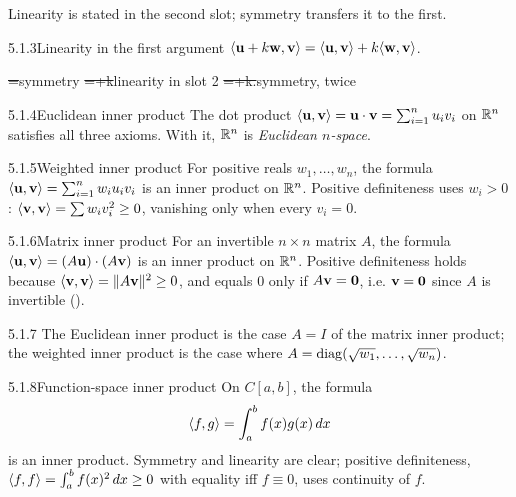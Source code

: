 Linearity is stated in the second slot; symmetry transfers it to the first.

\begin{lems}{5.1.3}{Linearity in the first argument}
$\langle \mathbf{u}+k\mathbf{w}, \mathbf{v} \rangle=\langle \mathbf{u}, \mathbf{v} \rangle+k\langle \mathbf{w}, \mathbf{v} \rangle$.
\end{lems}

\begin{prf}
\begin{steps}
\st{=}{symmetry}
\st{=\inner{\vv}{\vu}+k\inner{\vv}{\vw}}{linearity in slot 2}
\st{=\inner{\vu}{\vv}+k\inner{\vw}{\vv}.}{symmetry, twice}
\end{steps}
\end{prf}

\begin{exmp}{5.1.4}{Euclidean inner product}
The dot product $\langle \mathbf{u}, \mathbf{v} \rangle=\mathbf{u}\cdot\mathbf{v}=\sum_{i=1}^n u_iv_i$ on $\mathbb{R}^n$ satisfies all three axioms. With it, $\mathbb{R}^n$ is \emph{Euclidean $n$-space}.
\end{exmp}

\begin{exmp}{5.1.5}{Weighted inner product}
For positive reals $w_1,\dots,w_n$, the formula $\langle \mathbf{u}, \mathbf{v} \rangle=\sum_{i=1}^n w_iu_iv_i$ is an inner product on $\mathbb{R}^n$. Positive definiteness uses $w_i>0$: $\langle \mathbf{v}, \mathbf{v} \rangle=\sum w_iv_i^2\ge0$, vanishing only when every $v_i=0$.
\end{exmp}

\begin{exmp}{5.1.6}{Matrix inner product}
For an invertible $n\times n$ matrix $A$, the formula $\langle \mathbf{u}, \mathbf{v} \rangle=(A\mathbf{u})\cdot(A\mathbf{v})$ is an inner product on $\mathbb{R}^n$. Positive definiteness holds because $\langle \mathbf{v}, \mathbf{v} \rangle=\lVert A\mathbf{v} \rVert^2\ge0$, and equals $0$ only if $A\mathbf{v}=\mathbf{0}$, i.e. $\mathbf{v}=\mathbf{0}$ since $A$ is invertible ().
\end{exmp}

\begin{rmks}{5.1.7}
The Euclidean inner product is the case $A=I$ of the matrix inner product; the weighted inner product is the case where $A=\operatorname{diag}(\sqrt{w_1},\dots,\sqrt{w_n})$.
\end{rmks}

\begin{exmp}{5.1.8}{Function-space inner product}
On $C[a,b]$, the formula
\[
\langle f, g \rangle=\int_a^b f(x)g(x)\,dx
\]
is an inner product. Symmetry and linearity are clear; positive definiteness, $\langle f, f \rangle=\int_a^b f(x)^2\,dx\ge0$ with equality iff $f\equiv0$, uses continuity of $f$.
\end{exmp}

